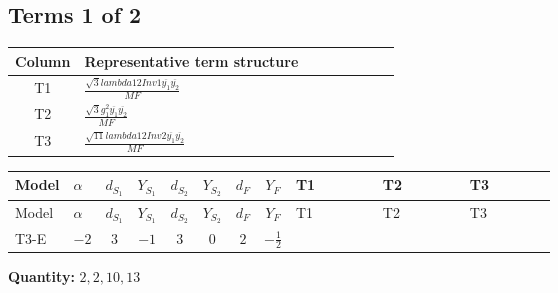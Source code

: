 \documentclass[8pt]{article}
\begin{document}
\begin{landscape}
\subsection*{Terms 1 of 2}
\begin{center}
\begin{tabular}{@{}c >{\raggedright\arraybackslash}p{0.82\linewidth}@{}}
\toprule
Column & Representative term structure \\
\midrule
T1 & \(\displaystyle \frac{\sqrt{3} lambda12Inv1 \overline{y_{1}} \overline{y_{2}}}{MF}\) \\
\midrule
T2 & \(\displaystyle \frac{\sqrt{3} g_{1}^{2} \overline{y_{1}} \overline{y_{2}}}{MF}\) \\
\midrule
T3 & \(\displaystyle \frac{\sqrt{11} lambda12Inv2 \overline{y_{1}} \overline{y_{2}}}{MF}\) \\
\midrule
\bottomrule
\end{tabular}
\end{center}
\smallskip
\tiny
\begin{longtable}{@{}llcccccc >{\raggedright\arraybackslash}p{0.21\linewidth} >{\raggedright\arraybackslash}p{0.21\linewidth} >{\raggedright\arraybackslash}p{0.21\linewidth}@{}}
\toprule
Model & $\alpha$ & $d_{S_1}$ & $Y_{S_1}$ & $d_{S_2}$ & $Y_{S_2}$ & $d_F$ & $Y_F$ & T1 & T2 & T3 \\
\midrule
\endfirsthead
\toprule
Model & $\alpha$ & $d_{S_1}$ & $Y_{S_1}$ & $d_{S_2}$ & $Y_{S_2}$ & $d_F$ & $Y_F$ & T1 & T2 & T3 \\
\midrule
\endhead
T3-E & $-2$ & $3$ & $-1$ & $3$ & $0$ & $2$ & $-\frac{1}{2}$ & \scriptsize\adjustbox{max width=\linewidth}{$\begin{gathered} - \frac{\sqrt{3} lambda12Inv1 \overline{y_{1}} \overline{y_{2}}}{6 MF}\end{gathered}$} & \scriptsize\adjustbox{max width=\linewidth}{$\begin{gathered} \frac{\sqrt{3} g_{1}^{2} \overline{y_{1}} \overline{y_{2}}}{8 MF}\end{gathered}$} & \scriptsize\adjustbox{max width=\linewidth}{$\begin{gathered} \frac{3 \sqrt{11} lambda12Inv2 \overline{y_{1}} \overline{y_{2}}}{22 MF}\end{gathered}$} \\
\midrule
\bottomrule
\end{longtable}
\clearpage
\noindent\textbf{Quantity: }$\mathrm{2,2,10,13}$\par\smallskip

\end{landscape}
\end{document}

